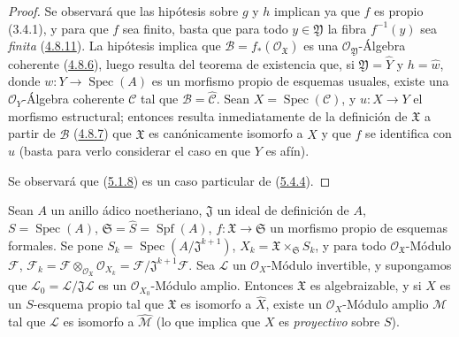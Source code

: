 \begin{proof}
Se observará que las hipótesis sobre $g$ y $h$ implican ya que $f$ es propio
(3.4.1), y para que $f$ sea finito, basta que para todo $y\in\mathfrak Y$ la
fibra $f^{-1}(y)$ sea \emph{finita} (\hyperref[III.4.8.11-fr]{4.8.11}). La hipótesis
implica que $\mathcal B=f_*(\mathcal O_{\mathfrak X})$ es una
$\mathcal O_{\mathfrak Y}$-Álgebra coherente
(\hyperref[III.4.8.6-fr]{4.8.6}), luego resulta del teorema de existencia que, si
$\mathfrak Y=\widehat Y$ y $h=\widehat w$, donde
$w:Y\to\operatorname{Spec}(A)$ es un morfismo propio de esquemas usuales,
existe una $\mathcal O_Y$-Álgebra coherente $\mathcal C$ tal que
$\mathcal B=\widehat{\mathcal C}$. Sean $X=\operatorname{Spec}(\mathcal C)$, y
$u:X\to Y$ el morfismo estructural; entonces resulta inmediatamente de la definición de
$\mathfrak X$ a partir de $\mathcal B$
(\hyperref[III.4.8.7-fr]{4.8.7}) que $\mathfrak X$ es canónicamente isomorfo a
$\widehat X$ y que $f$ se identifica con $\widehat u$ (basta para verlo
considerar el caso en que $Y$ es afín).

Se observará que (\hyperref[III.5.1.8-fr]{5.1.8}) es un caso particular de
(\hyperref[III.5.4.4-fr]{5.4.4}).
\end{proof}

\begin{theorem}[5.4.5]
\label{III.5.4.5-fr}
Sean $A$ un anillo ádico noetheriano, $\mathfrak J$ un ideal de definición de
$A$, $S=\operatorname{Spec}(A)$,
$\mathfrak S=\widehat S=\operatorname{Spf}(A)$,
$f:\mathfrak X\to\mathfrak S$ un morfismo propio de esquemas formales. Se pone
$S_k=\operatorname{Spec}(A/\mathfrak J^{k+1})$,
$X_k=\mathfrak X\times_{\mathfrak S}S_k$, y para todo
$\mathcal O_{\mathfrak X}$-Módulo $\mathcal F$,
$\mathcal F_k=\mathcal F\otimes_{\mathcal O_{\mathfrak X}}\mathcal O_{X_k}
=\mathcal F/\mathfrak J^{k+1}\mathcal F$.
Sea $\mathcal L$ un $\mathcal O_X$-Módulo invertible, y supongamos
que $\mathcal L_0=\mathcal L/\mathfrak J\mathcal L$ es un
$\mathcal O_{X_0}$-Módulo amplio. Entonces $\mathfrak X$ es algebraizable, y si
$X$ es un $S$-esquema propio tal que $\mathfrak X$ es isomorfo a
$\widehat X$, existe un $\mathcal O_X$-Módulo amplio $\mathcal M$ tal que
$\mathcal L$ es isomorfo a $\widehat{\mathcal M}$ \textup{(lo que implica que
$X$ es \emph{proyectivo} sobre $S$)}.
\end{theorem}

